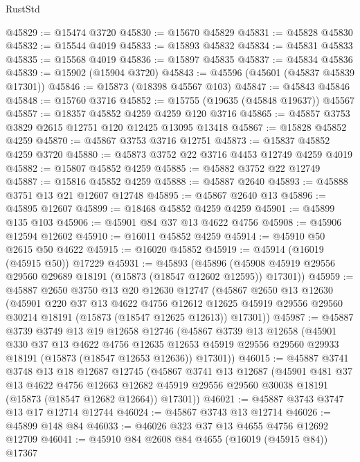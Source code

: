 \begin{lexlean}{RustStd}
\begin{coremodule}
@45829 := @15474 @3720
@45830 := @15670 @45829
@45831 := @45828 @45830
@45832 := @15544 @4019
@45833 := @15893 @45832
@45834 := @45831 @45833
@45835 := @15568 @4019
@45836 := @15897 @45835
@45837 := @45834 @45836
@45839 := @15902 (@15904 @3720)
@45843 := @45596 (@45601 (@45837 @45839 @17301))
@45846 := @15873 (@18398 @45567 @103)
@45847 := @45843 @45846
@45848 := @15760 @3716
@45852 := @15755 (@19635 (@45848 @19637)) @45567
@45857 := @18357 @45852 @4259 @4259 @120 @3716
@45865 := @45857 @3753 @3829 @2615 @12751 @120 @12425 @13095 @13418
@45867 := @15828 @45852 @4259
@45870 := @45867 @3753 @3716 @12751
@45873 := @15837 @45852 @4259 @3720
@45880 := @45873 @3752 @22 @3716 @4453 @12749 @4259 @4019
@45882 := @15807 @45852 @4259
@45885 := @45882 @3752 @22 @12749
@45887 := @15816 @45852 @4259
@45888 := @45887 @2640
@45893 := @45888 @3751 @13 @21 @12607 @12748
@45895 := @45867 @2640 @13
@45896 := @45895 @12607
@45899 := @18468 @45852 @4259 @4259
@45901 := @45899 @135 @103
@45906 := @45901 @84 @37 @13 @4622 @4756
@45908 := @45906 @12594 @12602
@45910 := @16011 @45852 @4259
@45914 := @45910 @50 @2615 @50 @4622
@45915 := @16020 @45852
@45919 := @45914 (@16019 (@45915 @50)) @17229
@45931 := @45893
    (@45896 (@45908 @45919 @29556 @29560 @29689 @18191 (@15873 (@18547 @12602 @12595)) @17301))
@45959 := @45887
    @2650
    @3750
    @13
    @20
    @12630
    @12747
    (@45867
      @2650
      @13
      @12630
      (@45901
        @220
        @37
        @13
        @4622
        @4756
        @12612
        @12625
        @45919
        @29556
        @29560
        @30214
        @18191
        (@15873 (@18547 @12625 @12613))
        @17301))
@45987 := @45887
    @3739
    @3749
    @13
    @19
    @12658
    @12746
    (@45867
      @3739
      @13
      @12658
      (@45901
        @330
        @37
        @13
        @4622
        @4756
        @12635
        @12653
        @45919
        @29556
        @29560
        @29933
        @18191
        (@15873 (@18547 @12653 @12636))
        @17301))
@46015 := @45887
    @3741
    @3748
    @13
    @18
    @12687
    @12745
    (@45867
      @3741
      @13
      @12687
      (@45901
        @481
        @37
        @13
        @4622
        @4756
        @12663
        @12682
        @45919
        @29556
        @29560
        @30038
        @18191
        (@15873 (@18547 @12682 @12664))
        @17301))
@46021 := @45887 @3743 @3747 @13 @17 @12714 @12744
@46024 := @45867 @3743 @13 @12714
@46026 := @45899 @148 @84
@46033 := @46026 @323 @37 @13 @4655 @4756 @12692 @12709
@46041 := @45910 @84 @2608 @84 @4655 (@16019 (@45915 @84)) @17367

\end{coremodule}
\end{lexlean}
